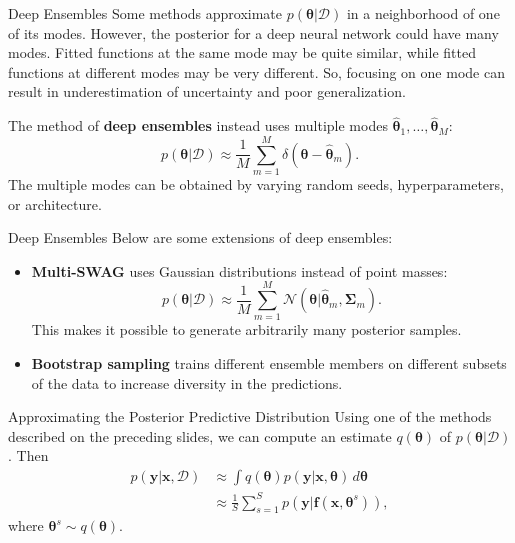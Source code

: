 \documentclass{beamer}
\begin{document}
\begin{frame}{Deep Ensembles}
    Some methods approximate $p(\boldsymbol{\theta} | \mathcal{D})$ in a neighborhood of one of its modes. However, the posterior for a deep neural network could have many modes. Fitted functions at the same mode may be quite similar, while fitted functions at different modes may be very different. So, focusing on one mode can result in underestimation of uncertainty and poor generalization.
    
    \medskip
    
    The method of \textbf{deep ensembles} instead uses multiple modes $\hat{\boldsymbol{\theta}}_1, \ldots, \hat{\boldsymbol{\theta}}_M$:
    \[
    p(\boldsymbol{\theta} | \mathcal{D}) \approx \frac{1}{M}\sum_{m = 1}^M \delta(\boldsymbol{\theta} - \hat{\boldsymbol{\theta}}_m).
    \]
    The multiple modes can be obtained by varying random seeds, hyperparameters, or architecture.
\end{frame}

\begin{frame}{Deep Ensembles}
    Below are some extensions of deep ensembles:
    \begin{itemize}
        \item \textbf{Multi-SWAG} uses Gaussian distributions instead of point masses:
        \[
        p(\boldsymbol{\theta} | \mathcal{D}) \approx \frac{1}{M}\sum_{m = 1}^M \mathcal{N}(\boldsymbol{\theta} | \hat{\boldsymbol{\theta}}_m, \boldsymbol{\Sigma}_m).
        \]
        This makes it possible to generate arbitrarily many posterior samples.
        \item \textbf{Bootstrap sampling} trains different ensemble members on different subsets of the data to increase diversity in the predictions.
    \end{itemize}
\end{frame}

\begin{frame}{Approximating the Posterior Predictive Distribution}
    Using one of the methods described on the preceding slides, we can compute an estimate $q(\boldsymbol{\theta})$ of $p(\boldsymbol{\theta} | \mathcal{D})$. Then
    \begin{align*}
        p(\boldsymbol{y} | \boldsymbol{x}, \mathcal{D}) &\approx \int q(\boldsymbol{\theta})p(\boldsymbol{y} | \boldsymbol{x}, \boldsymbol{\theta})\,d\boldsymbol{\theta} \\
        &\approx \frac{1}{S}\sum_{s = 1}^S p(\boldsymbol{y} | \boldsymbol{f}(\boldsymbol{x}, \boldsymbol{\theta}^s)),
    \end{align*}
    where $\boldsymbol{\theta}^s \sim q(\boldsymbol{\theta})$.
\end{frame}
\end{document}
